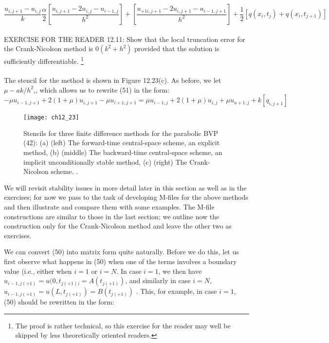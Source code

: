 \documentclass[../main.tex]{subfiles}
\begin{document}
\begin{equation}\label{eqa49}
\dfrac{u_{i,j+1}-u_{i,j}}{k}
\dfrac{\alpha}{2}[\dfrac{u_{i,j+1}-2u_{i,j}-u_{i-1,j}}{h^2}]
+[\dfrac{u_{+1i,j+1}-2u_{i,j+1}-u_{i-1,j+1}}{h^2}]
 +\dfrac{1}{2}[q(x_i,t_j)+q(x_i,t_{j+1})]
\end{equation}
\\
EXERCISE FOR THE READER 12.11: Show that the local truncation error for the Crank-Nicolson method is $0(k^2 +h^2)$ provided that the solution is sufficiently differentiable.
\footnote{The proof is rather technical, so this exercise for the reader may well be skipped by less theoretically 
oriented readers.}
\\
\\
The stencil for the method is shown in Figure 12.23(c). As before, we let  $\mu- ak/h^2$,, which allows us to rewrite (51) in the form:
\begin{equation}\label{eqa50}
-\mu u_{i-1,j+1}+2(1+\mu)u_{i,j+1}-\mu u_{i+1,j+1}=
\mu u_{i-1,j}+2(1+\mu)u_{i,j}+\mu u_{u+1,j}+k[q_{i,j+1}]
\end{equation}

\begin{figure}[H]
	\centering
	\texttt{[image: ch12\_23]}
	\caption{\textsf{Stencils for three finite difference methods for the parabolic BVP (42): (a) (left) The forward-time central-space scheme, an explicit method, (b) (middle) The backward-time central-space scheme, an implicit unconditionally stable method, (c) (right) The Crank-Nicolson scheme. .}}
	\label{pfig:ch12_23}
\end{figure}

We will revisit stability issues in more detail later in this section as well as in the exercises; for now we pass to the task of developing M-files for the above methods and then illustrate and compare them with some examples. The M-file constructions are similar to those in the last section; we outline now the construction only for the Crank-Nicolson method and leave the other two as exercises.


We can convert (50) into matrix form quite naturally. Before we do this, let us first observe what happens in (50) when one of the terms involves a boundary value (i.e., either when $i = 1$ or $i = N$. In case $i = 1$, we then have $u_{i-1,j(+1)}=u(0,t_{j(+1))}=A(t_{j(+1)})$, and similarly in case $i = N$, $u_{i-1,j(+1)}=u(L,t_{j(+1)})=B(t_{j(+1)})$ . This, for example, in case $i = 1$, (50) should be rewritten in the form:
\end{document}
